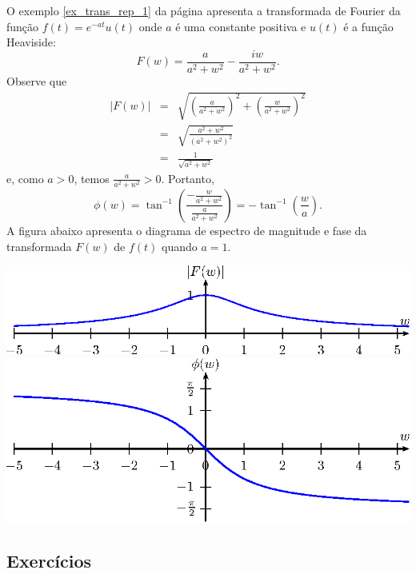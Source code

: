 \begin{ex} O exemplo \ref{ex_trans_rep_1} da página \pageref{ex_trans_rep_1} apresenta a transformada de Fourier da função $f(t)=e^{-at}u(t)$ onde $a$ é uma constante positiva e $u(t)$ é a função Heaviside: 
\begin{equation*}
F(w)=\frac{a}{a^2+w^2}-\frac{iw}{a^2+w^2}.
\end{equation*}
Observe que
\begin{eqnarray*}
|F(w)|&=&\sqrt{\left(\frac{a}{a^2+w^2}\right)^2+\left(\frac{w}{a^2+w^2}\right)^2}\\
&=&\sqrt{\frac{a^2+w^2}{\left(a^2+w^2\right)^2}}\\&=&\frac{1}{\sqrt{a^2+w^2}}
\end{eqnarray*}
e, como $a>0$, temos $\frac{a}{a^2+w^2}>0$. Portanto,
\begin{equation}
\phi(w)=\tan^{-1}\left(\frac{-\frac{w}{a^2+w^2}}{\frac{a}{a^2+w^2}}\right)=-\tan^{-1}\left(\frac{w}{a}\right).
\end{equation}
A figura abaixo apresenta o diagrama de espectro de magnitude e fase da transformada $F(w)$ de $f(t)$ quando $a=1$.
\begin{center}
\includegraphics[width=\textwidth]{cap_diagramas_espectro_transformada/pics/figura_2}\vspace{30pt}
\includegraphics[width=\textwidth]{cap_diagramas_espectro_transformada/pics/figura_3}\end{center}
\end{ex}
\subsection*{Exercícios}

